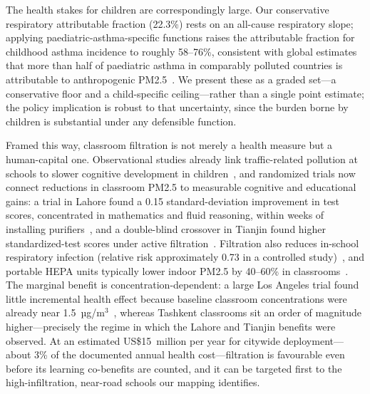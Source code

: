 \documentclass[11pt,a4paper]{article}
\begin{document}
The health stakes for children are correspondingly large. Our conservative respiratory attributable fraction (22.3\%) rests on an all-cause respiratory slope; applying paediatric-asthma-specific functions raises the attributable fraction for childhood asthma incidence to roughly 58--76\%, consistent with global estimates that more than half of paediatric asthma in comparably polluted countries is attributable to anthropogenic PM2.5~\cite{khreis2017exposure,anenberg2019global}. We present these as a graded set---a conservative floor and a child-specific ceiling---rather than a single point estimate; the policy implication is robust to that uncertainty, since the burden borne by children is substantial under any defensible function.

Framed this way, classroom filtration is not merely a health measure but a human-capital one. Observational studies already link traffic-related pollution at schools to slower cognitive development in children~\cite{sunyer2015association}, and randomized trials now connect reductions in classroom PM2.5 to measurable cognitive and educational gains: a trial in Lahore found a 0.15 standard-deviation improvement in test scores, concentrated in mathematics and fluid reasoning, within weeks of installing purifiers~\cite{malik2024classroom}, and a double-blind crossover in Tianjin found higher standardized-test scores under active filtration~\cite{marshall2024testscores}. Filtration also reduces in-school respiratory infection (relative risk approximately 0.73 in a controlled study)~\cite{banholzer2024aircleaners}, and portable HEPA units typically lower indoor PM2.5 by 40--60\% in classrooms~\cite{carmona2022schools,chen2015effectiveness,allen2011}. The marginal benefit is concentration-dependent: a large Los Angeles trial found little incremental health effect because baseline classroom concentrations were already near 1.5~µg/m$^3$~\cite{vieira2025hifive}, whereas Tashkent classrooms sit an order of magnitude higher---precisely the regime in which the Lahore and Tianjin benefits were observed. At an estimated US\$15~million per year for citywide deployment---about 3\% of the documented annual health cost---filtration is favourable even before its learning co-benefits are counted, and it can be targeted first to the high-infiltration, near-road schools our mapping identifies.
\end{document}
